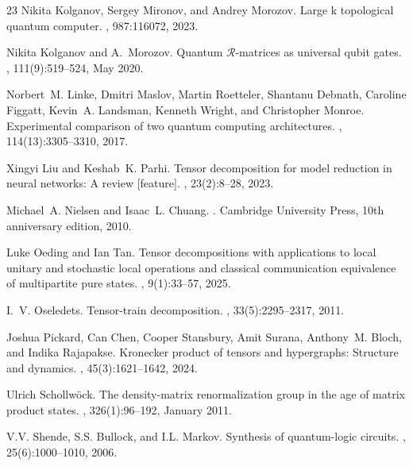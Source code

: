 \documentclass[a4paper, openany, 12pt]{article}
\theoremstyle{remark}
\theoremstyle{definition}
\begin{document}
\begin{thebibliography}{23}
Nikita Kolganov, Sergey Mironov, and Andrey Morozov.
\newblock Large k topological quantum computer.
, 987:116072, 2023.

Nikita Kolganov and A.~Morozov.
\newblock Quantum {$\mathcal{R}$}-matrices as universal qubit gates.
, 111(9):519--524, May 2020.

Norbert~M. Linke, Dmitri Maslov, Martin Roetteler, Shantanu Debnath, Caroline
  Figgatt, Kevin~A. Landsman, Kenneth Wright, and Christopher Monroe.
\newblock Experimental comparison of two quantum computing architectures.
,
  114(13):3305--3310, 2017.

Xingyi Liu and Keshab~K. Parhi.
\newblock Tensor decomposition for model reduction in neural networks: A
  review [feature].
, 23(2):8--28, 2023.

Michael~A. Nielsen and Isaac~L. Chuang.
.
\newblock Cambridge University Press, 10th anniversary edition, 2010.

Luke Oeding and Ian Tan.
\newblock Tensor decompositions with applications to local unitary and
  stochastic local operations and classical communication equivalence of
  multipartite pure states.
, 9(1):33--57,
  2025.

I.~V. Oseledets.
\newblock Tensor-train decomposition.
, 33(5):2295--2317, 2011.

Joshua Pickard, Can Chen, Cooper Stansbury, Amit Surana, Anthony~M. Bloch, and
  Indika Rajapakse.
\newblock Kronecker product of tensors and hypergraphs: Structure and dynamics.
,
  45(3):1621--1642, 2024.

Ulrich Schollwöck.
\newblock The density-matrix renormalization group in the age of matrix product
  states.
, 326(1):96--192, January 2011.

V.V. Shende, S.S. Bullock, and I.L. Markov.
\newblock Synthesis of quantum-logic circuits.
, 25(6):1000--1010, 2006.


\end{thebibliography}
\end{document}
